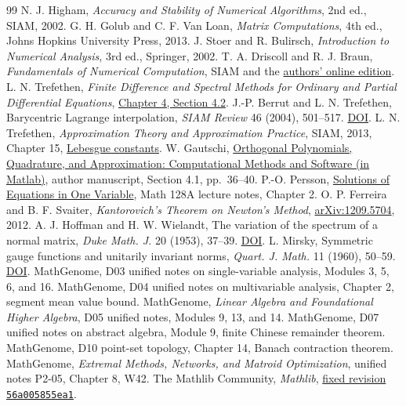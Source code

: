 \documentclass[11pt,oneside,openany]{book}
\theoremstyle{plain}
\theoremstyle{definition}
\theoremstyle{remark}
\begin{document}
\backmatter
\begingroup
\small
\begin{thebibliography}{99}
\setlength{\itemsep}{0.25em}
 N. J. Higham, \emph{Accuracy and Stability of
  Numerical Algorithms}, 2nd ed., SIAM, 2002.
 G. H. Golub and C. F. Van Loan, \emph{Matrix
  Computations}, 4th ed., Johns Hopkins University Press, 2013.
 J. Stoer and R. Bulirsch, \emph{Introduction to
  Numerical Analysis}, 3rd ed., Springer, 2002.
 T. A. Driscoll and R. J. Braun, \emph{Fundamentals
  of Numerical Computation}, SIAM and the
  \href{https://fncbook.com/}{authors' online edition}.
 L. N. Trefethen, \emph{Finite Difference and
  Spectral Methods for Ordinary and Partial Differential Equations},
  \href{https://people.maths.ox.ac.uk/trefethen/4all.pdf}{Chapter 4, Section 4.2}.
 J.-P. Berrut and L. N. Trefethen, Barycentric
  Lagrange interpolation, \emph{SIAM Review} 46 (2004), 501--517.
  \href{https://doi.org/10.1137/S0036144502417715}{DOI}.
 L. N. Trefethen, \emph{Approximation Theory
  and Approximation Practice}, SIAM, 2013, Chapter 15,
  \href{https://doi.org/10.1137/1.9781611975949.ch15}{Lebesgue constants}.
 W. Gautschi,
  \href{https://www.cs.purdue.edu/homes/wxg/selected_works/section_11/179.pdf}
       {Orthogonal Polynomials, Quadrature, and Approximation:
        Computational Methods and Software (in Matlab)},
  author manuscript, Section 4.1, pp.~36--40.
 P.-O. Persson,
  \href{https://persson.berkeley.edu/math128a/lecture_notes/math128a_lecture_notes_chapter_2.html}
       {Solutions of Equations in One Variable},
  Math 128A lecture notes, Chapter 2.
 O. P. Ferreira and B. F. Svaiter,
  \emph{Kantorovich's Theorem on Newton's Method},
  \href{https://arxiv.org/abs/1209.5704}{arXiv:1209.5704}, 2012.
 A. J. Hoffman and H. W. Wielandt,
  The variation of the spectrum of a normal matrix,
  \emph{Duke Math. J.} 20 (1953), 37--39.
  \href{https://doi.org/10.1215/S0012-7094-53-02004-3}{DOI}.
 L. Mirsky, Symmetric gauge functions and unitarily
  invariant norms, \emph{Quart. J. Math.} 11 (1960), 50--59.
  \href{https://doi.org/10.1093/qmath/11.1.50}{DOI}.
 MathGenome, D03 unified notes on single-variable analysis,
  Modules 3, 5, 6, and 16.
 MathGenome, D04 unified notes on multivariable analysis,
  Chapter 2, segment mean value bound.
 MathGenome, \emph{Linear Algebra and Foundational Higher
  Algebra}, D05 unified notes, Modules 9, 13, and 14.
 MathGenome, D07 unified notes on abstract algebra,
  Module 9, finite Chinese remainder theorem.
 MathGenome, D10 point-set topology,
  Chapter 14, Banach contraction theorem.
 MathGenome, \emph{Extremal Methods, Networks, and
  Matroid Optimization}, unified notes P2-05, Chapter 8, W42.
 The Mathlib Community, \emph{Mathlib},
  \href{https://github.com/leanprover-community/mathlib4/tree/56a005855ea17e0b0958f73ec801ae140b0a1679}
       {fixed revision \texttt{56a005855ea1}}.
\end{thebibliography}
\endgroup
\end{document}
